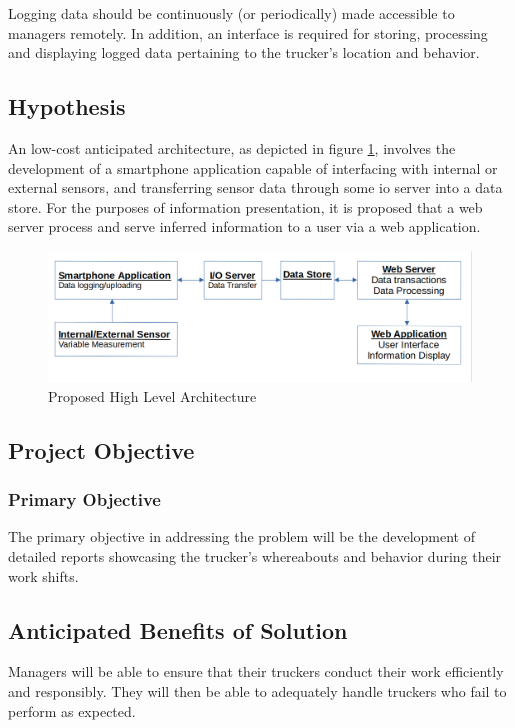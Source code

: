 Logging data should be continuously (or periodically) made accessible to managers remotely.
In addition, an interface is required for storing, processing and displaying logged data pertaining to the trucker's location and behavior.

\subsection{Hypothesis}
An low-cost anticipated architecture, as depicted in figure \ref{fig:high_arch}, involves the development of a smartphone application capable of interfacing with internal or external sensors, and transferring sensor data through some \ac{io} server into a data store. \cite{bertocco1998client}
For the purposes of information presentation, it is proposed that a web server process and serve inferred information to a user via a web application.
\begin{figure}[H]
    \centering
    \includegraphics[scale=0.45]{high_arch.png}
    \caption{Proposed High Level Architecture}
    \label{fig:high_arch}
\end{figure}

\subsection{Project Objective}
\subsubsection{Primary Objective}
The primary objective in addressing the problem will be the development of detailed reports showcasing the trucker's whereabouts and behavior during their work shifts.

\subsection{Anticipated Benefits of Solution}
Managers will be able to ensure that their truckers conduct their work efficiently and responsibly.
They will then be able to adequately handle truckers who fail to perform as expected.

